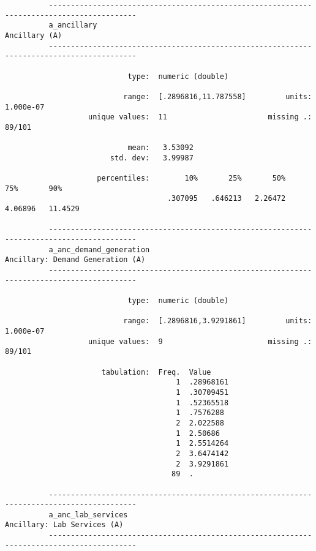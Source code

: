 \documentclass{article}
\begin{document}
\begin{verbatim}
          ------------------------------------------------------------------------------------------
          a_ancillary                                                                  Ancillary (A)
          ------------------------------------------------------------------------------------------
          
                            type:  numeric (double)
          
                           range:  [.2896816,11.787558]         units:  1.000e-07
                   unique values:  11                       missing .:  89/101
          
                            mean:   3.53092
                        std. dev:   3.99987
          
                     percentiles:        10%       25%       50%       75%       90%
                                     .307095   .646213   2.26472   4.06896   11.4529
          
          ------------------------------------------------------------------------------------------
          a_anc_demand_generation                                   Ancillary: Demand Generation (A)
          ------------------------------------------------------------------------------------------
          
                            type:  numeric (double)
          
                           range:  [.2896816,3.9291861]         units:  1.000e-07
                   unique values:  9                        missing .:  89/101
          
                      tabulation:  Freq.  Value
                                       1  .28968161
                                       1  .30709451
                                       1  .52365518
                                       1  .7576288
                                       2  2.022588
                                       1  2.50686
                                       1  2.5514264
                                       2  3.6474142
                                       2  3.9291861
                                      89  .
          
          ------------------------------------------------------------------------------------------
          a_anc_lab_services                                             Ancillary: Lab Services (A)
          ------------------------------------------------------------------------------------------
          

\end{verbatim}
\end{document}
